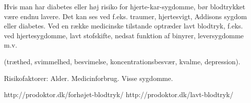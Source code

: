 Hvis man har diabetes eller høj risiko for hjerte-kar-sygdomme, bør blodtrykket være endnu lavere. Det kan ses ved f.eks. traumer, hjertesvigt, Addisons sygdom  eller diabetes.
Ved en række medicinske tilstande optræder lavt blodtryk, f.eks. ved hjertesygdomme, lavt stofskifte, nedsat funktion af binyrer, leversygdomme m.v.

 (træthed, svimmelhed, besvimelse, koncentrationsbesvær, kvalme, depression).  

Risikofaktorer: 
Alder. Medicinforbrug. Visse sygdomme.

http://prodoktor.dk/forhøjet-blodtryk/
http://prodoktor.dk/lavt-blodtryk/ 


